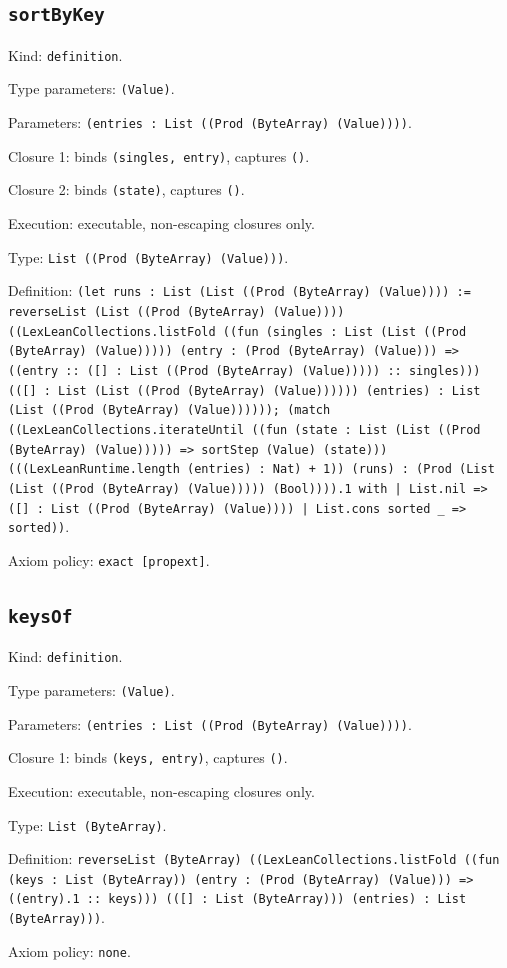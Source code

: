 \documentclass[11pt]{article}
\begin{document}
\subsection*{\texttt{sortByKey}}
\noindent Kind: \texttt{definition}.\par
\noindent Type parameters: \texttt{(Value)}.\par
\noindent Parameters: \texttt{(entries : List ((Prod (ByteArray) (Value))))}.\par
\noindent Closure 1: binds \texttt{(singles, entry)}, captures \texttt{()}.\par
\noindent Closure 2: binds \texttt{(state)}, captures \texttt{()}.\par
\noindent Execution: executable, non-escaping closures only.\par
\noindent Type: \texttt{List ((Prod (ByteArray) (Value)))}.\par
\noindent Definition: \texttt{(let runs : List (List ((Prod (ByteArray) (Value)))) := reverseList (List ((Prod (ByteArray) (Value)))) ((LexLeanCollections.listFold ((fun (singles : List (List ((Prod (ByteArray) (Value))))) (entry : (Prod (ByteArray) (Value))) => ((entry :: ([] : List ((Prod (ByteArray) (Value))))) :: singles))) (([] : List (List ((Prod (ByteArray) (Value)))))) (entries) : List (List ((Prod (ByteArray) (Value)))))); (match ((LexLeanCollections.iterateUntil ((fun (state : List (List ((Prod (ByteArray) (Value))))) => sortStep (Value) (state))) (((LexLeanRuntime.length (entries) : Nat) + 1)) (runs) : (Prod (List (List ((Prod (ByteArray) (Value))))) (Bool)))).1 with | List.nil => ([] : List ((Prod (ByteArray) (Value)))) | List.cons sorted \_ => sorted))}.\par
\noindent Axiom policy: \texttt{exact [propext]}.\par
\subsection*{\texttt{keysOf}}
\noindent Kind: \texttt{definition}.\par
\noindent Type parameters: \texttt{(Value)}.\par
\noindent Parameters: \texttt{(entries : List ((Prod (ByteArray) (Value))))}.\par
\noindent Closure 1: binds \texttt{(keys, entry)}, captures \texttt{()}.\par
\noindent Execution: executable, non-escaping closures only.\par
\noindent Type: \texttt{List (ByteArray)}.\par
\noindent Definition: \texttt{reverseList (ByteArray) ((LexLeanCollections.listFold ((fun (keys : List (ByteArray)) (entry : (Prod (ByteArray) (Value))) => ((entry).1 :: keys))) (([] : List (ByteArray))) (entries) : List (ByteArray)))}.\par
\noindent Axiom policy: \texttt{none}.\par
\end{document}
